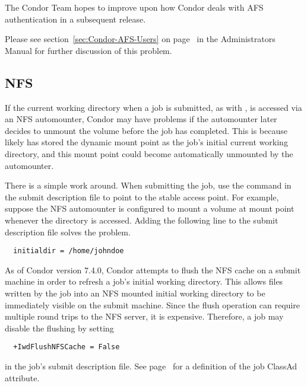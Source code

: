 The Condor Team hopes to improve upon how Condor deals with AFS 
authentication in a subsequent release.

Please see section~\ref{sec:Condor-AFS-Users} on
page~\pageref{sec:Condor-AFS-Users} in the Administrators Manual for
further discussion of this problem.

\subsection{NFS}

If the current working directory when a job is submitted,
as with ,
is accessed via an NFS automounter, Condor may have problems if the
automounter later decides to unmount the volume before the job has
completed.
This is because  likely has stored the
dynamic mount point as the job's initial current working directory, and
this mount point could become automatically unmounted by the
automounter.

There is a simple work around.
When submitting the job,
use the  command in the submit description file to point to
the stable access point.
For example,
suppose the NFS automounter is configured to mount a volume at mount point
whenever the directory  is accessed.
Adding the following line to the
submit description file solves the problem.
\begin{verbatim}
  initialdir = /home/johndoe
\end{verbatim}

As of Condor version 7.4.0, 
Condor attempts to flush the NFS cache on a submit machine in order to
refresh a job's initial working directory.
This allows files written by the job into an NFS mounted 
initial working directory to be immediately visible on the submit machine.
Since the flush operation can require multiple round trips
to the NFS server, it is expensive.
Therefore, a job may disable the flushing by setting
\begin{verbatim}
  +IwdFlushNFSCache = False
\end{verbatim}
in the job's submit description file.
See page~\pageref{IwdFlushNFSCache-job-attribute} for a definition
of the job ClassAd attribute.

